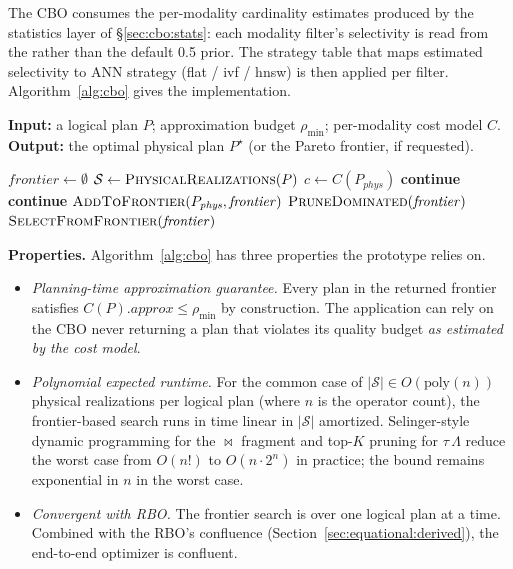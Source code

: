 \documentclass[sigconf,nonacm,review]{acmart}
\theoremstyle{plain}
\theoremstyle{definition}
\theoremstyle{remark}
\begin{document}
The CBO consumes the per-modality cardinality estimates produced
by the statistics layer of \S\ref{sec:cbo:stats}: each modality
filter's selectivity is read from the 
rather than the default 0.5 prior. The strategy table that maps
estimated selectivity to ANN strategy (flat / ivf / hnsw) is then
applied per filter. Algorithm~\ref{alg:cbo} gives the
implementation.

\begin{algorithm}[t]
\caption{Approximation-aware CBO search (A).}\label{alg:cbo}
\textbf{Input:} a logical plan $P$; approximation budget
$\rho_{\min}$; per-modality cost model $C$.
\textbf{Output:} the optimal physical plan
$P^\star$ (or the Pareto frontier, if requested).
\begin{algorithmic}[1]
  \State $\mathit{frontier} \gets \emptyset$
  \State $\mathcal{S} \gets \Call{PhysicalRealizations}{P}$
    \State $c \gets C(P_{\mathit{phys}})$
      \State \textbf{continue}
    \EndIf
      \State \textbf{continue}
    \EndIf
    \State $\Call{AddToFrontier}{P_{\mathit{phys}}, \mathit{frontier}}$
    \State $\Call{PruneDominated}{\mathit{frontier}}$
  \EndFor
  \State \Return $\Call{SelectFromFrontier}{\mathit{frontier}}$
\end{algorithmic}
\end{algorithm}

\noindent\textbf{Properties.} Algorithm~\ref{alg:cbo} has three
properties the prototype relies on.

\begin{itemize}[leftmargin=*]
  \item \emph{Planning-time approximation guarantee.} Every plan
    in the returned frontier satisfies
    $C(P).\mathit{approx} \leq \rho_{\min}$ by construction.
    The application can rely on the CBO never returning a plan that
    violates its quality budget \emph{as estimated by the cost model}.
  \item \emph{Polynomial expected runtime.} For the common case of
    $|\mathcal{S}| \in O(\mathrm{poly}(n))$ physical realizations
    per logical plan (where $n$ is the operator count), the
    frontier-based search runs in time linear in $|\mathcal{S}|$
    amortized. Selinger-style dynamic programming for the $\bowtie$
    fragment and top-$K$ pruning for $\tau\,\Lambda$ reduce the
    worst case from $O(n!)$ to $O(n \cdot 2^n)$ in practice; the
    bound remains exponential in $n$ in the worst case.
  \item \emph{Convergent with RBO.} The frontier search is
    over one logical plan at a time. Combined with the RBO's
    confluence (Section~\ref{sec:equational:derived}), the
    end-to-end optimizer is confluent.
\end{itemize}
\end{document}
